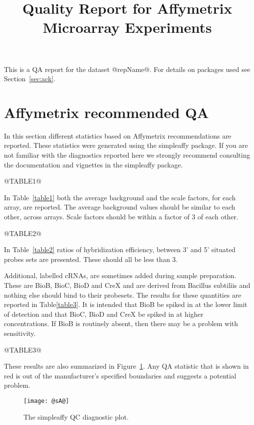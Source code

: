 \documentclass[11pt]{article}
\newcommand{\Rpackage}[1]{{\textsf{#1}}}
\begin{document}
\title{Quality Report for Affymetrix Microarray Experiments}

\maketitle

This is a QA report for the dataset @repName@.
For details on packages used see Section~\ref{sec:ack}.

\section{Affymetrix recommended QA}

In this section different statistics based on Affymetrix recommendations
are reported. These statistics were generated using the \Rpackage{simpleaffy} 
package. If you are not familiar with the diagnostics reported here we
strongly recommend consulting the documentation and vignettes in the
\Rpackage{simpleaffy} package.

@TABLE1@


In Table~\ref{table1} both the average background and the scale 
factors, for each array, are reported.  The average background values should 
be similar to each other, across arrays. Scale factors should be within
a factor of 3 of each other.

@TABLE2@

In Table~\ref{table2} ratios of hybridization efficiency, between 3' and
5' situated probes sets are presented. These should all be less than 3.

Additional, labelled cRNAs, are sometimes added during sample preparation. 
These are BioB, BioC, BioD and CreX and are derived from Bacillus subtiliis 
and nothing else should bind to their probesets. The results for these
quantities are reported in Table\ref{table3}. It is intended that BioB be spiked
in at the lower limit of detection and that BioC, BioD and CreX be
spiked in at higher concentrations. If BioB is routinely absent, then there
may be a problem with sensitivity.

@TABLE3@

These results are also summarized in Figure~\ref{fig:sA}. Any QA statistic
that is shown in red is out of the manufacturer's specified boundaries
and suggests a potential problem.


\begin{figure}[tp]
  \centering
\texttt{[image: @sA@]}

\caption{\label{fig:sA}%
The \Rpackage{simpleaffy} QC diagnostic plot.}
\end{figure}
\end{document}
